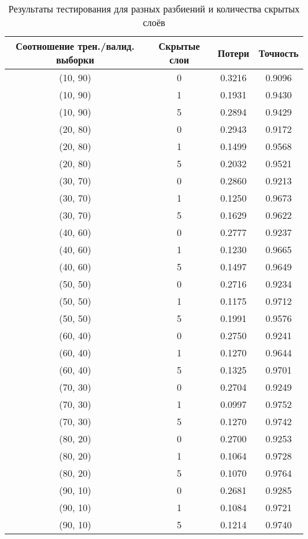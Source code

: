 \begin{table}[h]
    \centering
    \caption{Результаты тестирования для разных разбиений и количества скрытых слоёв}
    \begin{tabular}{|c|c|c|c|}
    \hline
    Соотношение трен./валид. выборки & Скрытые слои & Потери & Точность \\
    \hline
    (10, 90) & 0 & 0.3216 & 0.9096 \\
    (10, 90) & 1 & 0.1931 & 0.9430 \\
    (10, 90) & 5 & 0.2894 & 0.9429 \\
    \hline
    (20, 80) & 0 & 0.2943 & 0.9172 \\
    (20, 80) & 1 & 0.1499 & 0.9568 \\
    (20, 80) & 5 & 0.2032 & 0.9521 \\
    \hline
    (30, 70) & 0 & 0.2860 & 0.9213 \\
    (30, 70) & 1 & 0.1250 & 0.9673 \\
    (30, 70) & 5 & 0.1629 & 0.9622 \\
    \hline
    (40, 60) & 0 & 0.2777 & 0.9237 \\
    (40, 60) & 1 & 0.1230 & 0.9665 \\
    (40, 60) & 5 & 0.1497 & 0.9649 \\
    \hline
    (50, 50) & 0 & 0.2716 & 0.9234 \\
    (50, 50) & 1 & 0.1175 & 0.9712 \\
    (50, 50) & 5 & 0.1991 & 0.9576 \\
    \hline
    (60, 40) & 0 & 0.2750 & 0.9241 \\
    (60, 40) & 1 & 0.1270 & 0.9644 \\
    (60, 40) & 5 & 0.1325 & 0.9701 \\
    \hline
    (70, 30) & 0 & 0.2704 & 0.9249 \\
    (70, 30) & 1 & 0.0997 & 0.9752 \\
    (70, 30) & 5 & 0.1270 & 0.9742 \\
    \hline
    (80, 20) & 0 & 0.2700 & 0.9253 \\
    (80, 20) & 1 & 0.1064 & 0.9728 \\
    (80, 20) & 5 & 0.1070 & 0.9764 \\
    \hline
    (90, 10) & 0 & 0.2681 & 0.9285 \\
    (90, 10) & 1 & 0.1084 & 0.9721 \\
    (90, 10) & 5 & 0.1214 & 0.9740 \\
    \hline
    \end{tabular}
\end{table}

